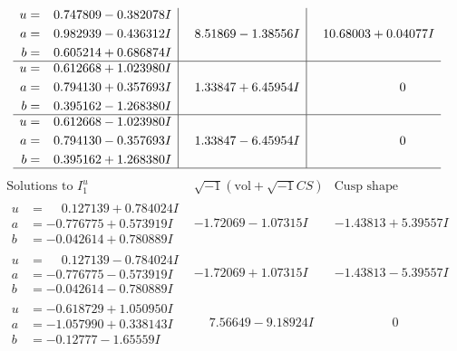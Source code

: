 \documentclass[1p]{elsarticle_modified}
\theoremstyle{definition}
\newcommand{\I}{\sqrt{-1}}
\begin{document}
$$\begin{array}{c|c|c}
\begin{aligned}
u &= \phantom{-}0.747809 - 0.382078 I \\
a &= \phantom{-}0.982939 - 0.436312 I \\
b &= \phantom{-}0.605214 + 0.686874 I\end{aligned}
 & \phantom{-}8.51869 - 1.38556 I & \phantom{-}10.68003 + 0.04077 I \\ \hline\begin{aligned}
u &= \phantom{-}0.612668 + 1.023980 I \\
a &= \phantom{-}0.794130 + 0.357693 I \\
b &= \phantom{-}0.395162 - 1.268380 I\end{aligned}
 & \phantom{-}1.33847 + 6.45954 I & \phantom{-0.000000 } 0 \\ \hline\begin{aligned}
u &= \phantom{-}0.612668 - 1.023980 I \\
a &= \phantom{-}0.794130 - 0.357693 I \\
b &= \phantom{-}0.395162 + 1.268380 I\end{aligned}
 & \phantom{-}1.33847 - 6.45954 I & \phantom{-0.000000 } 0\\
 \hline 
 \end{array}$$\newpage$$\begin{array}{c|c|c}  
\text{Solutions to }I^u_{1}& \I (\text{vol} + \sqrt{-1}CS) & \text{Cusp shape}\\
 \hline 
\begin{aligned}
u &= \phantom{-}0.127139 + 0.784024 I \\
a &= -0.776775 + 0.573919 I \\
b &= -0.042614 + 0.780889 I\end{aligned}
 & -1.72069 - 1.07315 I & -1.43813 + 5.39557 I \\ \hline\begin{aligned}
u &= \phantom{-}0.127139 - 0.784024 I \\
a &= -0.776775 - 0.573919 I \\
b &= -0.042614 - 0.780889 I\end{aligned}
 & -1.72069 + 1.07315 I & -1.43813 - 5.39557 I \\ \hline\begin{aligned}
u &= -0.618729 + 1.050950 I \\
a &= -1.057990 + 0.338143 I \\
b &= -0.12777 - 1.65559 I\end{aligned}
 & \phantom{-}7.56649 - 9.18924 I & \phantom{-0.000000 } 0 \\ \hline\begin{aligned}

\end{aligned}
\end{array}$$
\end{document}
